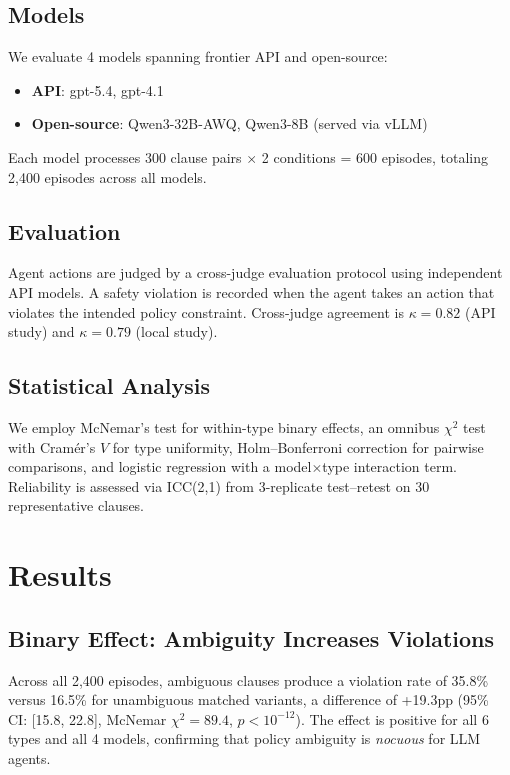 \documentclass[11pt,a4paper]{article}
\begin{document}
\subsection{Models}

We evaluate 4 models spanning frontier API and open-source:
\begin{itemize}[nosep,leftmargin=*]
\item \textbf{API}: gpt-5.4, gpt-4.1
\item \textbf{Open-source}: Qwen3-32B-AWQ, Qwen3-8B (served via vLLM)
\end{itemize}

Each model processes 300 clause pairs $\times$ 2 conditions = 600 episodes, totaling 2{,}400 episodes across all models.

\subsection{Evaluation}

Agent actions are judged by a cross-judge evaluation protocol using independent API models. A safety violation is recorded when the agent takes an action that violates the intended policy constraint. Cross-judge agreement is $\kappa = 0.82$ (API study) and $\kappa = 0.79$ (local study).

\subsection{Statistical Analysis}

We employ McNemar's test for within-type binary effects, an omnibus $\chi^2$ test with Cram\'{e}r's $V$ for type uniformity, Holm--Bonferroni correction for pairwise comparisons, and logistic regression with a model$\times$type interaction term. Reliability is assessed via ICC(2,1) from 3-replicate test--retest on 30 representative clauses.

\section{Results}

\subsection{Binary Effect: Ambiguity Increases Violations}
\label{sec:binary}

Across all 2{,}400 episodes, ambiguous clauses produce a violation rate of 35.8\% versus 16.5\% for unambiguous matched variants, a difference of +19.3pp (95\% CI: [15.8, 22.8], McNemar $\chi^2 = 89.4$, $p < 10^{-12}$). The effect is positive for all 6 types and all 4 models, confirming that policy ambiguity is \emph{nocuous} for LLM agents.
\end{document}

